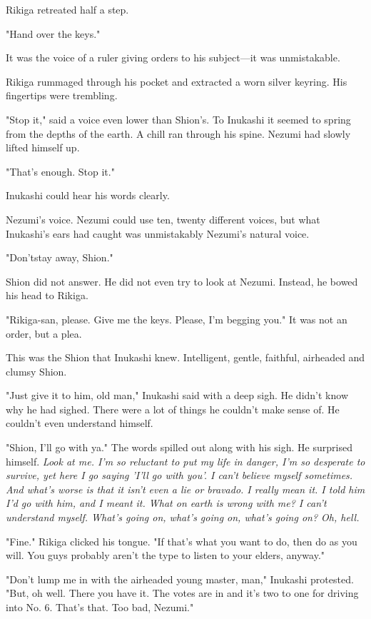 Rikiga retreated half a step.

"Hand over the keys."

It was the voice of a ruler giving orders to his subject---it was
unmistakable.

Rikiga rummaged through his pocket and extracted a worn silver keyring.
His fingertips were trembling.

"\el Stop it," said a voice even lower than Shion's. To Inukashi it
seemed to spring from the depths of the earth. A chill ran through his
spine. Nezumi had slowly lifted himself up.

"That's enough. Stop it."

Inukashi could hear his words clearly.

Nezumi's voice. Nezumi could use ten, twenty different voices, but what
Inukashi's ears had caught was unmistakably Nezumi's natural voice.

"Don't\el stay away, Shion."

Shion did not answer. He did not even try to look at Nezumi. Instead, he
bowed his head to Rikiga.

"Rikiga-san, please. Give me the keys. Please, I'm begging you." It was
not an order, but a plea.

This was the Shion that Inukashi knew. Intelligent, gentle, faithful,
airheaded and clumsy Shion.

"Just give it to him, old man," Inukashi said with a deep sigh. He
didn't know why he had sighed. There were a lot of things he couldn't
make sense of. He couldn't even understand himself.

"Shion, I'll go with ya." The words spilled out along with his sigh. He
surprised himself. \emph{Look at me. I'm so reluctant to put my life in
danger, I'm so desperate to survive, yet here I go saying 'I'll go with
you'. I can't believe myself sometimes. And what's worse is that it
isn't even a lie or bravado. I really mean it. I told him I'd go with
him, and I meant it. What on earth is wrong with me? I can't understand
myself. What's going on, what's going on, what's going on? Oh, hell.}

"Fine." Rikiga clicked his tongue. "If that's what you want to do, then
do as you will. You guys probably aren't the type to listen to your
elders, anyway."

"Don't lump me in with the airheaded young master, man," Inukashi
protested. "But, oh well. There you have it. The votes are in and it's
two to one for driving into No. 6. That's that. Too bad, Nezumi."

